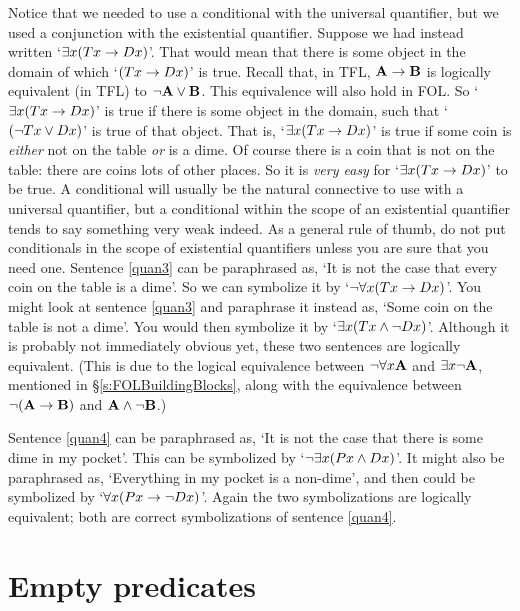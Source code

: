 Notice that we needed to use a conditional with the universal quantifier, but we used a conjunction with the existential quantifier. Suppose we had instead written `$\exists x(Tx \rightarrow Dx)$'. That would mean that there is some object in the domain of which `$(Tx \rightarrow Dx)$' is true. Recall that, in TFL, $\mathbf{A} \rightarrow \mathbf{B}$ is logically equivalent (in TFL) to $\neg\mathbf{A} \vee \mathbf{B}$. This equivalence will also hold in FOL. So `$\exists x(Tx \rightarrow Dx)$' is true if there is some object in the domain, such that `$(\neg Tx \vee Dx)$' is true of that object. That is, `$\exists x (Tx \rightarrow Dx)$' is true if some coin is \emph{either} not on the table \emph{or} is a dime. Of course there is a coin that is not on the table: there are coins lots of other places. So it is \emph{very easy} for `$\exists x(Tx \rightarrow Dx)$' to be true. A conditional will usually be the natural connective to use with a universal quantifier, but a conditional within the scope of an existential quantifier tends to say something very weak indeed. As a general rule of thumb, do not put conditionals in the scope of existential quantifiers unless you are sure that you need one.
Sentence \ref{quan3} can be paraphrased as, `It is not the case that every coin on the table is a dime'. So we can symbolize it by `$\neg \forall x(Tx \rightarrow Dx)$'. You might look at sentence \ref{quan3} and paraphrase it instead as, `Some coin on the table is not a dime'. You would then symbolize it by `$\exists x(Tx \wedge \neg Dx)$'. Although it is probably not immediately obvious yet, these two sentences are logically equivalent. (This is due to the logical equivalence between $\neg\forall x\mathbf{A}$ and $\exists x\neg\mathbf{A}$, mentioned in \S\ref{s:FOLBuildingBlocks}, along with the equivalence between $\neg(\mathbf{A}\rightarrow\mathbf{B})$ and $\mathbf{A}\wedge\neg\mathbf{B}$.)

Sentence \ref{quan4} can be paraphrased as, `It is not the case that there is some dime in my pocket'. This can be symbolized by `$\neg\exists x(Px \wedge Dx)$'. It might also be paraphrased as, `Everything in my pocket is a non-dime', and then could be symbolized by `$\forall x(Px \rightarrow \neg Dx)$'. Again the two symbolizations are logically equivalent; both are correct symbolizations of sentence \ref{quan4}.


\section{Empty predicates}

